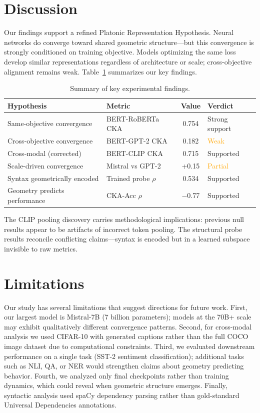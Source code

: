 \documentclass{article}
\begin{document}
\section{Discussion}

Our findings support a refined Platonic Representation Hypothesis. Neural networks do converge toward shared geometric structure---but this convergence is strongly conditioned on training objective. Models optimizing the same loss develop similar representations regardless of architecture or scale; cross-objective alignment remains weak. Table~\ref{tab:summary} summarizes our key findings.

\begin{table}[t]
\centering
\caption{Summary of key experimental findings.}
\label{tab:summary}
\small
\begin{tabular}{@{}llcl@{}}
\toprule
\textbf{Hypothesis} & \textbf{Metric} & \textbf{Value} & \textbf{Verdict} \\
\midrule
Same-objective convergence & BERT-RoBERTa CKA & 0.754 & \textcolor{green!70!black}{Strong support} \\
Cross-objective convergence & BERT-GPT-2 CKA & 0.182 & \textcolor{orange}{Weak} \\
Cross-modal (corrected) & BERT-CLIP CKA & 0.715 & \textcolor{green!70!black}{Supported} \\
Scale-driven convergence & Mistral vs GPT-2 & +0.15 & \textcolor{orange}{Partial} \\
Syntax geometrically encoded & Trained probe $\rho$ & 0.534 & \textcolor{green!70!black}{Supported} \\
Geometry predicts performance & CKA-Acc $\rho$ & $-$0.77 & \textcolor{green!70!black}{Supported} \\
\bottomrule
\end{tabular}
\end{table}

The CLIP pooling discovery carries methodological implications: previous null results appear to be artifacts of incorrect token pooling. The structural probe results reconcile conflicting claims---syntax is encoded but in a learned subspace invisible to raw metrics.

\section{Limitations}

Our study has several limitations that suggest directions for future work. First, our largest model is Mistral-7B (7 billion parameters); models at the 70B+ scale may exhibit qualitatively different convergence patterns. Second, for cross-modal analysis we used CIFAR-10 with generated captions rather than the full COCO image dataset due to computational constraints. Third, we evaluated downstream performance on a single task (SST-2 sentiment classification); additional tasks such as NLI, QA, or NER would strengthen claims about geometry predicting behavior. Fourth, we analyzed only final checkpoints rather than training dynamics, which could reveal when geometric structure emerges. Finally, syntactic analysis used spaCy dependency parsing rather than gold-standard Universal Dependencies annotations.
\end{document}
